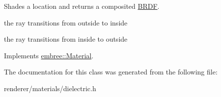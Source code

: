 Shades a location and returns a composited \hyperlink{classembree_1_1_b_r_d_f}{BRDF}. 



the ray transitions from outside to inside

the ray transitions from inside to outside 



Implements \hyperlink{classembree_1_1_material_a371ca178d6cc226c3d6c758cb41f8cef}{embree::Material}.



The documentation for this class was generated from the following file:\begin{DoxyCompactItemize}
\item 
renderer/materials/dielectric.h\end{DoxyCompactItemize}
